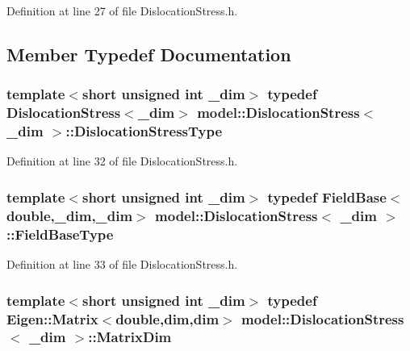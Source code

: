 Definition at line 27 of file Dislocation\+Stress.\+h.



\subsection{Member Typedef Documentation}
\hypertarget{structmodel_1_1_dislocation_stress_a91be77696dd95f550d7b6fae004a4c1a}{}
\subsubsection[{Dislocation\+Stress\+Type}]{\setlength{\rightskip}{0pt plus 5cm}template$<$short unsigned int \+\_\+dim$>$ typedef {\bf Dislocation\+Stress}$<$\+\_\+dim$>$ {\bf model\+::\+Dislocation\+Stress}$<$ \+\_\+dim $>$\+::{\bf Dislocation\+Stress\+Type}}\label{structmodel_1_1_dislocation_stress_a91be77696dd95f550d7b6fae004a4c1a}


Definition at line 32 of file Dislocation\+Stress.\+h.

\hypertarget{structmodel_1_1_dislocation_stress_ad7890f960ed6c1a4719c5621ac98c6e5}{}
\subsubsection[{Field\+Base\+Type}]{\setlength{\rightskip}{0pt plus 5cm}template$<$short unsigned int \+\_\+dim$>$ typedef {\bf Field\+Base}$<$double,\+\_\+dim,\+\_\+dim$>$ {\bf model\+::\+Dislocation\+Stress}$<$ \+\_\+dim $>$\+::{\bf Field\+Base\+Type}}\label{structmodel_1_1_dislocation_stress_ad7890f960ed6c1a4719c5621ac98c6e5}


Definition at line 33 of file Dislocation\+Stress.\+h.

\hypertarget{structmodel_1_1_dislocation_stress_a2cf61e24522b244ae3024b58195d8e6e}{}
\subsubsection[{Matrix\+Dim}]{\setlength{\rightskip}{0pt plus 5cm}template$<$short unsigned int \+\_\+dim$>$ typedef Eigen\+::\+Matrix$<$double,{\bf dim},{\bf dim}$>$ {\bf model\+::\+Dislocation\+Stress}$<$ \+\_\+dim $>$\+::{\bf Matrix\+Dim}}\label{structmodel_1_1_dislocation_stress_a2cf61e24522b244ae3024b58195d8e6e}


